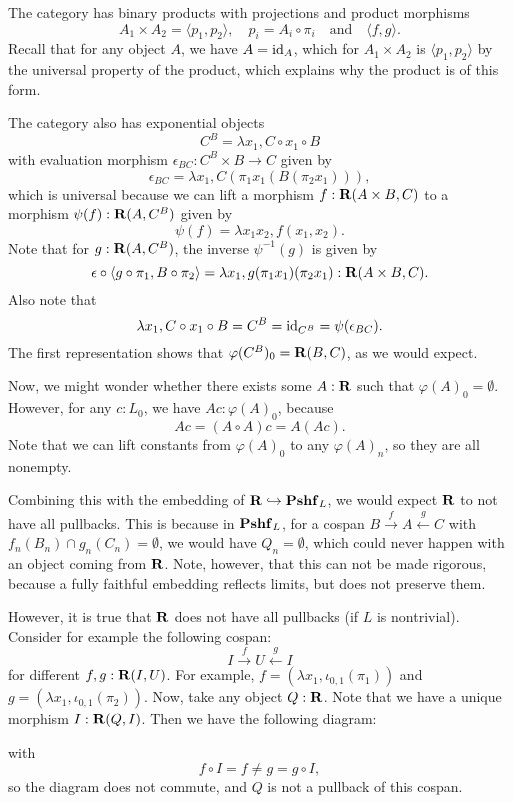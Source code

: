 The category has binary products with projections and product morphisms
\[ A_1 \times A_2 = \langle p_1, p_2 \rangle, \quad p_i = A_i \circ \pi_i \quad \text{and} \quad \langle f, g \rangle. \]
Recall that for any object $ A $, we have $ A = \text{id}_{A} $, which for $ A_1 \times A_2 $ is $ \langle p_1, p_2 \rangle $ by the universal property of the product, which explains why the product is of this form.

The category also has exponential objects
\[ C^B = \lambda x_1, C \circ x_1 \circ B \]
with evaluation morphism $ \epsilon_{BC}: C^B \times B \to C $ given by
\[ \epsilon_{BC} = \lambda x_1, C(\pi_1 x_1 (B (\pi_2 x_1))), \]
which is universal because we can lift a morphism $ f: \mathbf{R}(A \times B, C) $ to a morphism $ \psi(f): \mathbf{R}(A, C^B) $ given by
\[ \psi(f) = \lambda x_1 x_2, f (x_1, x_2). \]
Note that for $ g: \mathbf{R}(A, C^B) $, the inverse $ \psi^{-1}(g) $ is given by
\[ \epsilon \circ \langle g \circ \pi_1, B \circ \pi_2 \rangle = \lambda x_1, g (\pi_1 x_1) (\pi_2 x_1): \mathbf{R}(A \times B, C). \]
Also note that
\[ \lambda x_1, C \circ x_1 \circ B = C^B = \text{id}_{C^B} = \psi(\epsilon_{BC}). \]
The first representation shows that $ \varphi(C^B)_0 = \mathbf{R}(B, C) $, as we would expect.

Now, we might wonder whether there exists some $ A: \mathbf{R} $ such that $ \varphi(A)_0 = \emptyset $. However, for any $ c : L_0 $, we have $ A c : \varphi(A)_0 $, because
\[ A c = (A \circ A) c = A (A c). \]
Note that we can lift constants from $ \varphi(A)_0 $ to any $ \varphi(A)_n $, so they are all nonempty.

Combining this with the embedding of $ \mathbf{R} \hookrightarrow \mathbf{Pshf}_{L} $, we would expect $ \mathbf{R} $ to not have all pullbacks. This is because in $ \mathbf{Pshf}_{L} $, for a cospan $ B \xrightarrow f A \xleftarrow g C $ with $ f_n(B_n) \cap g_n(C_n) = \emptyset $, we would have $ Q_n = \emptyset $, which could never happen with an object coming from $ \mathbf{R} $. Note, however, that this can not be made rigorous, because a fully faithful embedding reflects limits, but does not preserve them.

However, it is true that $ \mathbf{R} $ does not have all pullbacks (if $ L $ is nontrivial). Consider for example the following cospan:
\[ I \xrightarrow f U \xleftarrow g I \]
for different $ f, g: \mathbf{R}(I, U) $. For example, $ f = (\lambda x_1, \iota_{0, 1}(\pi_1)) $ and $ g = (\lambda x_1, \iota_{0, 1}(\pi_2)) $. Now, take any object $ Q: \mathbf{R} $. Note that we have a unique morphism $ I: \mathbf{R}(Q, I) $. Then we have the following diagram:
\begin{center}
\end{center}
with
\[ f \circ I = f \not = g = g \circ I, \]
so the diagram does not commute, and $ Q $ is not a pullback of this cospan.


